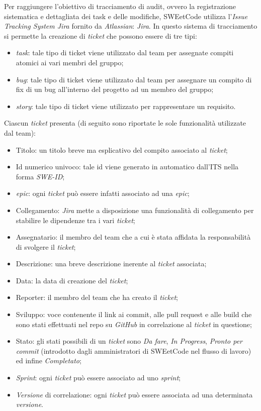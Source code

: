 \documentclass[10pt, a4paper]{article}
\begin{document}
Per raggiungere l'obiettivo di tracciamento di audit, ovvero la registrazione sistematica e dettagliata dei task e delle modifiche, SWEetCode utilizza 
l'\textit{Issue Tracking System Jira} fornito da \textit{Atlassian}: \textit{Jira}.
In questo sistema di tracciamento si permette la creazione di \textit{ticket} che possono essere di tre tipi:
\begin{itemize}
    \item \textit{task}: tale tipo di ticket viene utilizzato dal team per assegnate compiti atomici ai vari membri del gruppo;
    \item \textit{bug}: tale tipo di ticket viene utilizzato dal team per assegnare un compito di fix di un bug all'interno del progetto ad un membro del gruppo; 
    \item \textit{story}: tale tipo di ticket viene utilizzato per rappresentare un requisito.
\end{itemize}
Ciascun \textit{ticket} presenta (di seguito sono riportate le sole funzionalità utilizzate dal team):
\begin{itemize}
    \item Titolo: un titolo breve ma esplicativo del compito associato al \textit{ticket};
    \item Id numerico univoco: tale id viene generato in automatico dall'ITS nella forma \textit{SWE-ID};
    \item \textit{epic}: ogni \textit{ticket} può essere infatti associato ad una \textit{epic};
    \item Collegamento: \textit{Jira} mette a disposizione una funzionalità di collegamento per stabilire le dipendenze tra i vari \textit{ticket};
    \item Assegnatario: il membro del team che a cui è stata affidata la responsabilità di svolgere il \textit{ticket};
    \item Descrizione: una breve descrizione inerente al \textit{ticket} associata;
    \item Data: la data di creazione del \textit{ticket};
    \item Reporter: il membro del team che ha creato il \textit{ticket};
    \item Sviluppo: voce contenente il link ai commit, alle pull request e alle build che sono stati effettuati nel repo su \textit{GitHub} in correlazione al \textit{ticket} in questione;
    \item Stato: gli stati possibili di un \textit{ticket} sono \textit{Da fare}, \textit{In Progress}, \textit{Pronto per commit} (introdotto dagli amministratori di SWEetCode nel flusso di lavoro) ed infine \textit{Completato};
    \item \textit{Sprint}: ogni \textit{ticket} può essere associato ad uno \textit{sprint};
    \item \textit{Versione} di correlazione: ogni \textit{ticket} può essere associata ad una determinata \textit{versione}.
\end{itemize}
\end{document}

